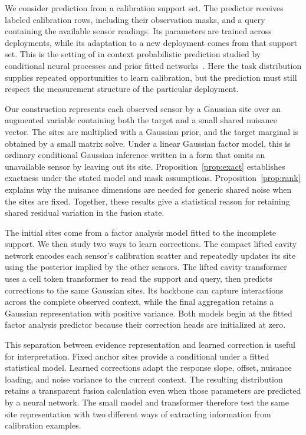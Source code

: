We consider prediction from a calibration support set. The predictor receives labeled calibration rows, including their observation masks, and a query containing the available sensor readings. Its parameters are trained across deployments, while its adaptation to a new deployment comes from that support set. This is the setting of in context probabilistic prediction studied by conditional neural processes and prior fitted networks~\citep{garnelo2018cnp,muller2022pfn,hollmann2025tabpfnv2}. Here the task distribution supplies repeated opportunities to learn calibration, but the prediction must still respect the measurement structure of the particular deployment.

Our construction represents each observed sensor by a Gaussian site over an augmented variable containing both the target and a small shared nuisance vector. The sites are multiplied with a Gaussian prior, and the target marginal is obtained by a small matrix solve. Under a linear Gaussian factor model, this is ordinary conditional Gaussian inference written in a form that omits an unavailable sensor by leaving out its site. Proposition~\ref{prop:exact} establishes exactness under the stated model and mask assumptions. Proposition~\ref{prop:rank} explains why the nuisance dimensions are needed for generic shared noise when the sites are fixed. Together, these results give a statistical reason for retaining shared residual variation in the fusion state.

The initial sites come from a factor analysis model fitted to the incomplete support. We then study two ways to learn corrections. The compact lifted cavity network encodes each sensor's calibration scatter and repeatedly updates its site using the posterior implied by the other sensors. The lifted cavity transformer uses a cell token transformer to read the support and query, then predicts corrections to the same Gaussian sites. Its backbone can capture interactions across the complete observed context, while the final aggregation retains a Gaussian representation with positive variance. Both models begin at the fitted factor analysis predictor because their correction heads are initialized at zero.

This separation between evidence representation and learned correction is useful for interpretation. Fixed anchor sites provide a conditional under a fitted statistical model. Learned corrections adapt the response slope, offset, nuisance loading, and noise variance to the current context. The resulting distribution retains a transparent fusion calculation even when those parameters are predicted by a neural network. The small model and transformer therefore test the same site representation with two different ways of extracting information from calibration examples.

